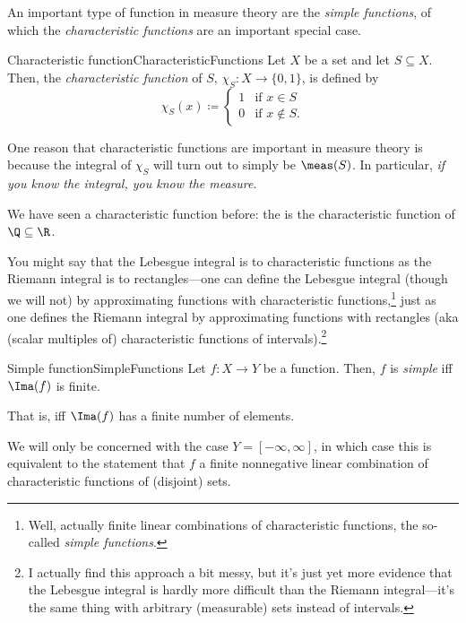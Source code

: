 An important type of function in measure theory are the \emph{simple functions}, of which the \emph{characteristic functions} are an important special case.
\begin{dfn}{Characteristic function}{CharacteristicFunctions}
Let $X$ be a set and let $S\subseteq X$.  Then, the \emph{characteristic function} of $S$, $\chi _S:X\rightarrow \{ 0,1\}$, is defined by
\begin{equation}
\chi _S(x)\coloneqq \begin{cases}1 & \text{if }x\in S \\ 0 & \text{if }x\notin S.\end{cases}
\end{equation}
\begin{rmk}
One reason that characteristic functions are important in measure theory is because the integral of $\chi _S$ will turn out to simply be $\meas (S)$.  In particular, \emph{if you know the integral, you know the measure}.
\end{rmk}
\begin{rmk}
We have seen a characteristic function before:  the  is the characteristic function of $\Q \subseteq \R$.
\end{rmk}
\begin{rmk}
You might say that the Lebesgue integral is to characteristic functions as the Riemann integral is to rectangles---one can define the Lebesgue integral (though we will not) by approximating functions with characteristic functions,\footnote{Well, actually finite linear combinations of characteristic functions, the so-called \emph{simple functions}.} just as one defines the Riemann integral by approximating functions with rectangles (aka (scalar multiples of) characteristic functions of intervals).\footnote{I actually find this approach a bit messy, but it's just yet more evidence that the Lebesgue integral is hardly more difficult than the Riemann integral---it's the same thing with arbitrary (measurable) sets instead of intervals.}
\end{rmk}
\end{dfn}
\begin{dfn}{Simple function}{SimpleFunctions}
Let $f\colon X\rightarrow Y$ be a function.  Then, $f$ is \emph{simple} iff $\Ima (f)$ is finite.
\begin{rmk}
That is, iff $\Ima (f)$ has a finite number of elements.
\end{rmk}
\begin{rmk}
We will only be concerned with the case $Y=[-\infty ,\infty ]$, in which case this is equivalent to the statement that $f$ a finite nonnegative linear combination of characteristic functions of (disjoint) sets.
\end{rmk}
\end{dfn}

